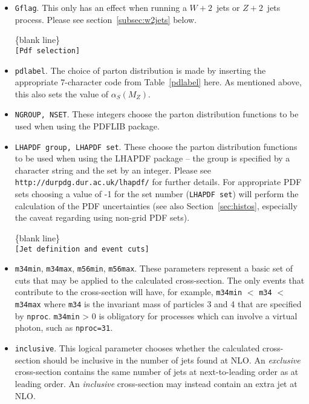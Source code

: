 \documentclass[12pt]{article}
\begin{document}
\begin{itemize}
\item {\tt Gflag}. This only has an effect when running a
$W+2$~jets or $Z+2$~jets process. Please see section~\ref{subsec:w2jets}
below.

\begin{center}
\{blank line\} \\
{\tt [Pdf selection] }
\end{center}

\item {\tt pdlabel}. The choice of parton distribution is made by
inserting the appropriate 7-character code from Table~{\ref{pdlabel}}
here. As mentioned above, this also sets the value of $\alpha_S(M_Z)$.

\item {\tt NGROUP, NSET}. These integers choose the parton distribution
functions to be used when using the PDFLIB package.
\item {\tt LHAPDF group, LHAPDF set}. These choose the parton
distribution functions to be used when using the LHAPDF package --
the group is specified by a character string and the set by an integer.
Please see {\tt http://durpdg.dur.ac.uk/lhapdf/} for further details.
For appropriate PDF sets choosing a value of -1 for the set number ({\tt  LHAPDF set}) 
will perform the calculation of the PDF uncertainties (see also
Section~\ref{sec:histos}, especially the caveat regarding using
non-grid PDF sets).

\begin{center}
\{blank line\} \\
{\tt [Jet definition and event cuts] }
\end{center}

\item {\tt m34min}, {\tt m34max}, {\tt m56min}, {\tt m56max}.
These parameters represent a basic set of cuts that may be applied
to the calculated cross-section. The only events that contribute to
the cross-section will have, for example,
{\tt m34min} $<$ {\tt m34} $<$ {\tt m34max} where {\tt m34} is the
invariant mass of particles 3 and 4 that are specified by {\tt nproc}.
{\tt m34min} > 0 is obligatory for processes which can involve a virtual
photon, such as {\tt nproc=31}.
\item {\tt inclusive}.  This logical parameter chooses whether the
calculated cross-section should be inclusive in the number of jets
found at NLO. An {\em exclusive}
cross-section contains the same number of jets at next-to-leading
order as at leading order. An {\em inclusive} cross-section may
instead contain an extra jet at NLO.


\end{itemize}
\end{document}
